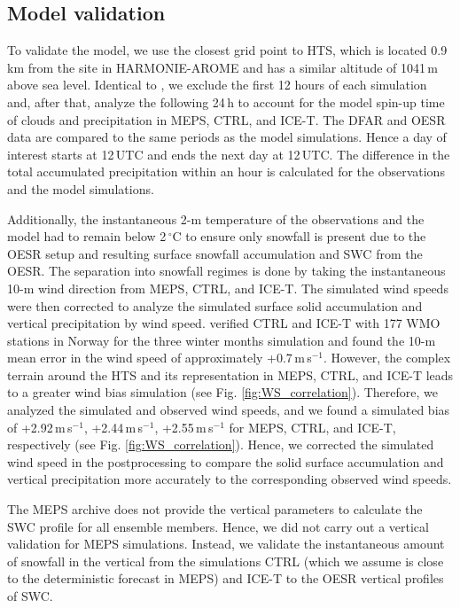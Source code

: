 \documentclass{ametsocV5}
\begin{document}
	\subsection{Model validation}\label{sec:methodology:MEPS_vali}
		To validate the model, we use the closest grid point to HTS, which is located 0.9\,km from the site in HARMONIE-AROME and has a similar altitude of 1041\,m above sea level. Identical to \citet{engdahl_effects_2020}, we exclude the first 12 hours of each simulation and, after that, analyze the following 24\,h to account for the model spin-up time of clouds and precipitation in MEPS, CTRL, and ICE-T. The DFAR and OESR data are compared to the same periods as the model simulations. Hence a day of interest starts at 12\,UTC and ends the next day at 12\,UTC. The difference in the total accumulated precipitation within an hour is calculated for the observations and the model simulations. 
		
		Additionally, the instantaneous 2-m temperature of the observations and the model had to remain below 2\,$^{\circ}$C to ensure only snowfall is present due to the OESR setup and resulting surface snowfall accumulation and SWC from the OESR. The separation into snowfall regimes is done by taking the instantaneous 10-m wind direction from MEPS, CTRL, and ICE-T. The simulated wind speeds were then corrected to analyze the simulated surface solid accumulation and vertical precipitation by wind speed. \citet{engdahl_effects_2020} verified CTRL and ICE-T with 177 WMO stations in Norway for the three winter months simulation and found the 10-m mean error in the wind speed of approximately +0.7\,m\,s$^{-1}$. However, the complex terrain around the HTS and its representation in MEPS, CTRL, and ICE-T leads to a greater wind bias simulation (see Fig. \ref{fig:WS_correlation}). Therefore, we analyzed the simulated and observed wind speeds, and we found a simulated bias of +2.92\,m\,s$^{-1}$, +2.44\,m\,s$^{-1}$, +2.55\,m\,s$^{-1}$ for MEPS, CTRL, and ICE-T, respectively (see Fig. \ref{fig:WS_correlation}). Hence, we corrected the simulated wind speed in the postprocessing to compare the solid surface accumulation and vertical precipitation more accurately to the corresponding observed wind speeds. 
		
		
		The MEPS archive does not provide the vertical parameters to calculate the SWC profile for all ensemble members. Hence, we did not carry out a vertical validation for MEPS simulations. Instead, we validate the instantaneous amount of snowfall in the vertical from the simulations CTRL (which we assume is close to the deterministic forecast in MEPS) and ICE-T to the OESR vertical profiles of SWC.
		
\end{document}
